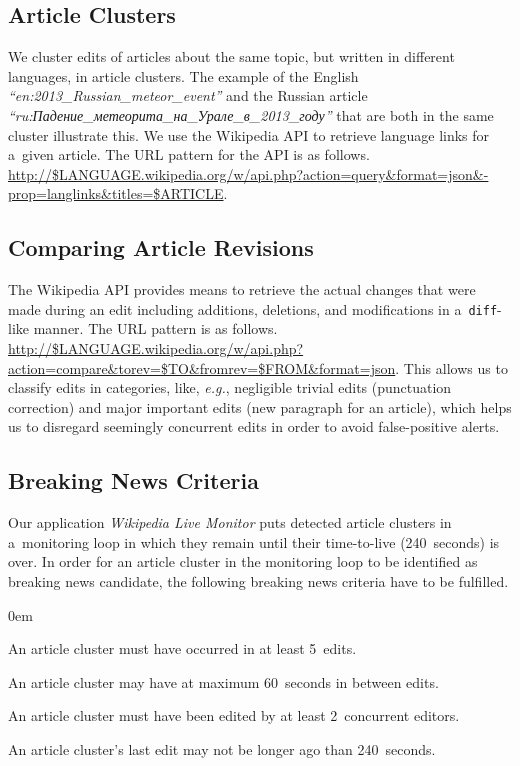 \documentclass{www13-companion-accepted}
\newcommand{\inlinelistingsize}{\fontsize{8pt}{11pt}}
\let\oldurl\url
\renewcommand{\url}[1]{\inlinelistingsize\oldurl{#1}}
\begin{document}
\subsection{Article Clusters}

We cluster edits of articles about the same topic,
but written in different languages, in article clusters.
The example of the English
\emph{``en:2013\_Russian\_meteor\_event''}
and the Russian article \selectfont
\emph{``ru:Падение\_метеорита\_на\_Урале\_в\_2013\_году''}
\selectfont that are both in the same cluster illustrate this.
We use the Wikipedia API to retrieve language links for a~given article.
The URL pattern for the API is as follows.
\url{http://$LANGUAGE.wikipedia.org/w/api.php?action=query&format=json&-prop=langlinks&titles=$ARTICLE}.

\subsection{Comparing Article Revisions}
\label{sec:comparing-article-revisions}

The Wikipedia API provides means to retrieve the actual changes
that were made during an edit including additions, deletions,
and modifications in a~\texttt{diff}-like manner.
The URL pattern is as follows.
\url{http://$LANGUAGE.wikipedia.org/w/api.php?action=compare&torev=$TO&fromrev=$FROM&format=json}. %
This allows us to classify edits in categories, like, \emph{e.g.},
negligible trivial edits (punctuation correction) and
major important edits (new paragraph for an article),
which helps us to disregard seemingly concurrent edits
in order to avoid false-positive alerts.

\subsection{Breaking News Criteria}

Our application \emph{Wikipedia Live Monitor} puts
detected article clusters in a~monitoring loop in which they remain
until their time-to-live (240~seconds) is over.
In order for an article cluster in the monitoring loop
to be identified as breaking news candidate,
the following breaking news criteria have to be fulfilled.

\begin{description}
  \itemsep0em
  \item[$\geq$~5~Occurrences:] An article cluster must have occurred
  in at least 5~edits.
  \item[$\leq$~60~Seconds Between Edits:] An article cluster may have
  at maximum 60~seconds in between edits.
  \item[$\geq$~2~Concurrent Editors:] An article cluster must have been edited
  by at least 2~concurrent editors.
  \item[$\leq$~240~Seconds Since Last Edit:] An article cluster's last edit
  may not be longer ago than 240~seconds.
\end{description}
\end{document}

